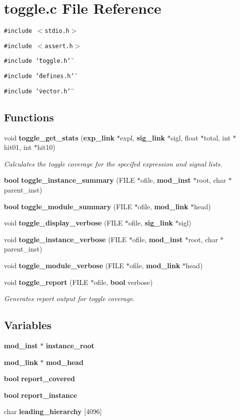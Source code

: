 \section{toggle.c File Reference}
\label{toggle_8c}
{\tt \#include $<$stdio.h$>$}\par
{\tt \#include $<$assert.h$>$}\par
{\tt \#include \char`\"{}toggle.h\char`\"{}}\par
{\tt \#include \char`\"{}defines.h\char`\"{}}\par
{\tt \#include \char`\"{}vector.h\char`\"{}}\par
\subsection*{Functions}
\begin{CompactItemize}
\item 
void {\bf toggle\_\-get\_\-stats} ({\bf exp\_\-link} $\ast$expl, {\bf sig\_\-link} $\ast$sigl, float $\ast$total, int $\ast$hit01, int $\ast$hit10)
\begin{CompactList}\small\item\em Calculates the toggle coverage for the specifed expression and signal lists.\item\end{CompactList}\item 
{\bf bool} {\bf toggle\_\-instance\_\-summary} (FILE $\ast$ofile, {\bf mod\_\-inst} $\ast$root, char $\ast$parent\_\-inst)
\item 
{\bf bool} {\bf toggle\_\-module\_\-summary} (FILE $\ast$ofile, {\bf mod\_\-link} $\ast$head)
\item 
void {\bf toggle\_\-display\_\-verbose} (FILE $\ast$ofile, {\bf sig\_\-link} $\ast$sigl)
\item 
void {\bf toggle\_\-instance\_\-verbose} (FILE $\ast$ofile, {\bf mod\_\-inst} $\ast$root, char $\ast$parent\_\-inst)
\item 
void {\bf toggle\_\-module\_\-verbose} (FILE $\ast$ofile, {\bf mod\_\-link} $\ast$head)
\item 
void {\bf toggle\_\-report} (FILE $\ast$ofile, {\bf bool} verbose)
\begin{CompactList}\small\item\em Generates report output for toggle coverage.\item\end{CompactList}\end{CompactItemize}
\subsection*{Variables}
\begin{CompactItemize}
\item 
{\bf mod\_\-inst} $\ast$ {\bf instance\_\-root}
\item 
{\bf mod\_\-link} $\ast$ {\bf mod\_\-head}
\item 
{\bf bool} {\bf report\_\-covered}
\item 
{\bf bool} {\bf report\_\-instance}
\item 
char {\bf leading\_\-hierarchy} [4096]
\end{CompactItemize}


